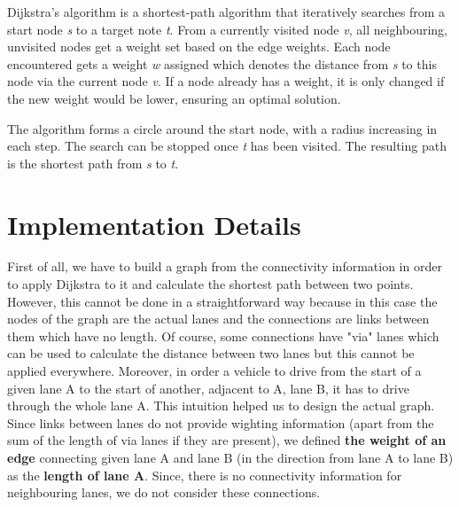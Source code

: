 Dijkstra's algorithm is a shortest-path algorithm that iteratively searches from a start node \emph{s} to a target note \emph{t}\cite{skiena1998algorithm}. From a currently visited node \emph{v}, all neighbouring, unvisited nodes get a weight set based on the edge weights. Each node encountered gets a weight \emph{w} assigned which denotes the distance from \emph{s} to this node via the current node \emph{v}. If a node already has a weight, it is only changed if the new weight would be lower, ensuring an optimal solution.

The algorithm forms a circle around the start node, with a radius increasing in each step. The search can be stopped once \emph{t} has been visited. The resulting path is the shortest path from \emph{s} to \emph{t}.

\section{Implementation Details}
First of all, we have to build a graph from the connectivity information in order to apply Dijkstra to it and calculate the shortest path between two points. However, this cannot be done in a straightforward way because in this case the nodes of the graph are the actual lanes and the connections are links between them which have no length. Of course, some connections have "via" lanes which can be used to calculate the distance between two lanes but this cannot be applied everywhere. Moreover, in order a vehicle to drive from the start of a given lane A to the start of another, adjacent to A, lane B, it has to drive through the whole lane A. This intuition helped us to design the actual graph. Since links between lanes do not provide wighting information (apart from the sum of the length of via lanes if they are present), we defined \textbf{the weight of an edge} connecting given lane A and lane B (in the direction from lane A to lane B) as the \textbf{length of lane A}. Since, there is no connectivity information for neighbouring lanes, we do not consider these connections.

